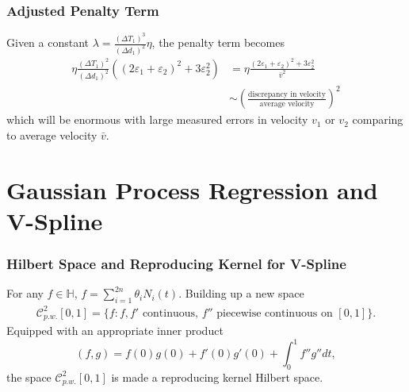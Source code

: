 \documentclass{beamer}
\begin{document}
\begin{frame}
\frametitle{Adjusted Penalty Term}
Given a constant $\lambda = \frac{\left(\Delta T_1\right)^3}{\left(\Delta d_1\right)^2}\eta$, the penalty term becomes
\begin{equation}\begin{split}
\eta \frac{\left(\Delta T_1\right)^2}{\left(\Delta d_1\right)^2} \left(\left(2\varepsilon_1+\varepsilon_2\right)^2+3\varepsilon_2^2\right)
&= \eta \frac{\left(2\varepsilon_1+\varepsilon_2\right)^2+3\varepsilon_2^2}{\bar{v}^2} \\&\sim \left(\frac{\mbox{discrepancy in velocity}}{\mbox{average velocity}}\right)^2
\end{split}
\end{equation}
which will be enormous with large measured errors in velocity $v_1$ or $v_2$ comparing to average velocity $\bar{v}$. 
\end{frame}

\section{Gaussian Process Regression and V-Spline}

\begin{frame}
\frametitle{Hilbert Space and Reproducing Kernel for V-Spline}

For any $f \in \mathbb{H}$, $f=\sum_{i=1}^{2n} \theta_i N_i(t).$ Building up a new space \begin{align*}
\mathcal{C}_{p.w.}^{2}[0,1]=\{f:f,f' \mbox{ continuous, } f'' \mbox{ piecewise continuous on } [0,1] \}.
\end{align*} 
Equipped with an appropriate inner product
\begin{equation}
(f,g)=f(0) g(0)+f'(0) g'(0)+\int_{0}^{1}f''g''dt,
\end{equation}
the space $\mathcal{C}_{p.w.}^{2}[0,1]$ is made a reproducing kernel Hilbert space.
\end{frame}
\end{document}
